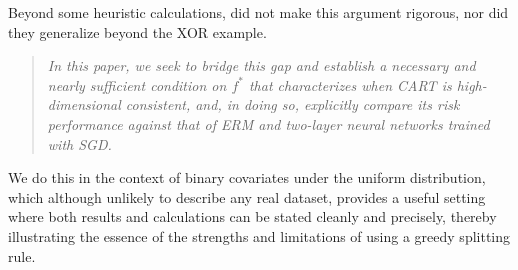 \documentclass[11pt]{article}
\DeclarePairedDelimiter{\braces}{\lbrace}{\rbrace}
\renewcommand{\xspace}{\mathcal{X}}
\newcommand{\binspace}{\braces{\pm 1}^\nfeats}
\newcommand{\nfeats}{d}
\begin{document}
Beyond some heuristic calculations, \cite{syrgkanis2020estimation} did not make this argument rigorous, nor did they generalize beyond the XOR example.
\begin{quote}
\normalsize\emph{In this paper, we seek to bridge this gap and
establish a necessary and nearly sufficient condition on $f^*$ that characterizes when CART is high-dimensional consistent, and, in doing so, explicitly compare its risk performance against that of ERM and two-layer neural networks trained with SGD.}
\end{quote}
We do this in the context of binary covariates under the uniform distribution, which although unlikely to describe any real dataset, provides a useful setting where both results and calculations can be stated cleanly and precisely, thereby illustrating the essence of the strengths and limitations of using a greedy splitting rule.







\end{document}
